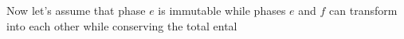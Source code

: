 Now let's assume that phase \(e\) is immutable while phases \(e\) and \(f\) can transform into each other while conserving the total ental